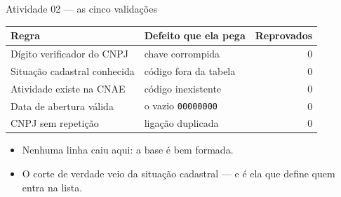 \documentclass[aspectratio=169]{beamer}
\begin{document}
\begin{frame}{Atividade 02 --- as cinco validações}
    \begin{table}
        \small
        \begin{tabular}{llr}
            \toprule
            Regra & Defeito que ela pega & Reprovados \\
            \midrule
            Dígito verificador do CNPJ & chave corrompida & 0 \\
            Situação cadastral conhecida & código fora da tabela & 0 \\
            Atividade existe na CNAE & código inexistente & 0 \\
            Data de abertura válida & o vazio \texttt{00000000} & 0 \\
            CNPJ sem repetição & ligação duplicada & 0 \\
            \bottomrule
        \end{tabular}
    \end{table}

    \begin{itemize}
        \item Nenhuma linha caiu aqui: a base é bem formada.
        \item O corte de verdade veio da situação cadastral --- e é ela que
              define quem entra na lista.
    \end{itemize}
\end{frame}
\end{document}
